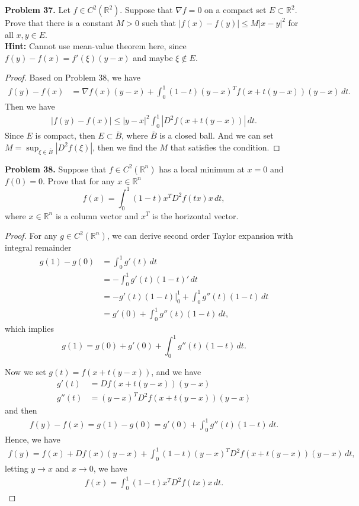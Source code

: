 \documentclass[12pt,leqno]{amsart}
\theoremstyle{definition}
\begin{document}
\medskip

\noindent
{\bf Problem 37.}
Let $f\in C^2(\mathbb{R}^2)$. Suppose that $\nabla f=0$ on a compact set
$E\subset\mathbb{R}^2$. Prove that there is a constant $M>0$ such that
$|f(x)-f(y)|\leq M|x-y|^2$ for all $x,y\in E$. \\
\textbf{Hint:} Cannot use mean-value theorem here, since $f(y) - f(x) = f'(\xi)(y-x)$ and maybe $\xi \notin E$.
\begin{proof}
Based on Problem 38, we have
\begin{align*}
    f(y) - f(x) & = \nabla f(x)(y-x) + \int^1_0 (1-t) (y-x)^T f(x+t(y-x)) (y-x)\, dt.
\end{align*}
Then we have 
\begin{align*}
    \left|f(y) - f(x)\right| \leq  |y-x|^2 \int^1_0 \left|D^2f(x+t(y-x))\right|\, dt.
\end{align*}
Since $E$ is compact, then $E \subset \overline{B}$, where $\overline{B}$ is a closed ball. And we can set $M = \sup_{\xi \in \overline{B}}\left|D^2 f(\xi)\right|$, then we find the $M$ that satisfies the condition.
\end{proof}

\medskip


\noindent
{\bf Problem 38.}
Suppose that $f\in C^2(\mathbb{R}^n)$ has a local minimum at $x=0$ and $f(0)=0$. Prove that for any $x\in\mathbb{R}^n$
$$
f(x)=\int_0^1 (1-t)x^TD^2f(tx)x\, dt,
$$
where $x\in\mathbb{R}^n$ is a column vector and $x^T$ is the horizontal vector.
\begin{proof}
For any $g\in C^2(\mathbb{R}^n)$, we can derive second order Taylor expansion with integral remainder 
\begin{align*}
    g(1) - g(0) & = \int^1_0 g'(t)\, dt \\
    & = - \int^1_0 g'(t)(1-t)'\, dt \\
    & = -g'(t)(1-t)\Big|^1_0 + \int^1_0 g''(t)(1-t)\, dt \\
    & = g'(0) + \int^1_0 g''(t)(1-t)\, dt, 
\end{align*}
which implies $$g(1) = g(0) + g'(0) + \int^1_0 g''(t)(1-t)\, dt.$$ 

Now we set $g(t) = f(x+t(y-x))$, and we have 
\begin{align*}
    g'(t) & = Df(x+t(y-x)) (y-x) \\
    g''(t) & = (y-x)^T D^2 f(x+t(y-x)) (y-x)
\end{align*}
and then 
\begin{align*}
    f(y) - f(x) = g(1) - g(0) = g'(0) + \int^1_0 g''(t)(1-t)\, dt.
\end{align*}
Hence, we have
\begin{align*}
    f(y) = f(x) + Df(x)(y-x) + \int^1_0 (1-t) (y-x)^T D^2 f(x+t(y-x)) (y-x)\, dt,
\end{align*}
letting $y\to x$ and $x\to 0$, we have
\begin{align*}
    f(x) = \int_0^1 (1-t)x^T D^2f(tx) x\, dt.
\end{align*}
\end{proof}
\end{document}
